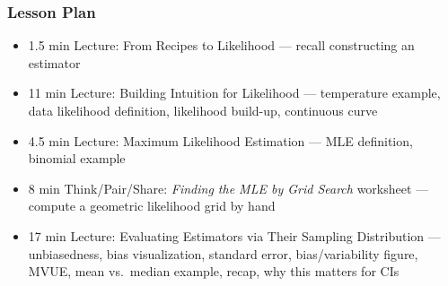 \begin{frame}
    \frametitle{Lesson Plan}
    \begin{itemize}
        \item 1.5 min Lecture: From Recipes to Likelihood --- recall constructing an estimator
        \item 11 min Lecture: Building Intuition for Likelihood --- temperature example, data likelihood definition, likelihood build-up, continuous curve
        \item 4.5 min Lecture: Maximum Likelihood Estimation --- MLE definition, binomial example
        \item 8 min Think/Pair/Share: \textit{Finding the MLE by Grid Search} worksheet --- compute a geometric likelihood grid by hand
        \item 17 min Lecture: Evaluating Estimators via Their Sampling Distribution --- unbiasedness, bias visualization, standard error, bias/variability figure, MVUE, mean vs.\ median example, recap, why this matters for CIs
    \end{itemize}
\end{frame}

